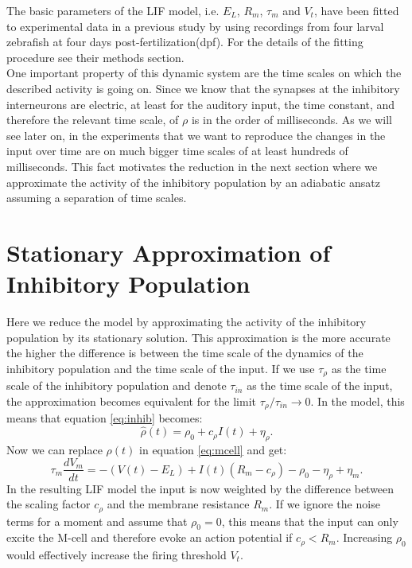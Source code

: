 \documentclass[a4paper,10pt,hidelinks]{scrreprt}
\begin{document}
	The basic parameters of the LIF model, i.e. $E_L$, $R_m$, $\tau_m$ and $V_t$, have been fitted to experimental data in a previous study by \cite{Koyama2016} using recordings from four larval zebrafish at four days post-fertilization(dpf).
	For the details of the fitting procedure see their methods section.\\
	One important property of this dynamic system are the time scales on which the described activity is going on.
	Since we know that the synapses at the inhibitory interneurons are electric, at least for the auditory input, the time constant, and therefore the relevant time scale, of $\rho$ is in the order of milliseconds.
	As we will see later on, in the experiments that we want to reproduce the changes in the input over time are on much bigger time scales of at least hundreds of milliseconds.
	This fact motivates the reduction in the next section where we approximate the activity of the inhibitory population by an adiabatic ansatz assuming a separation of time scales.
	\section{Stationary Approximation of Inhibitory Population}\label{approx inhibition}
	Here we reduce the model by approximating the activity of the inhibitory population by its 
	stationary solution.
	This approximation is the more accurate the higher the difference is between the time scale of the dynamics of the inhibitory population and the time scale of the input.
	If we use $\tau_{\rho}$ as the time scale of the inhibitory population and denote $\tau_{in}$ as the time scale of the input, the approximation becomes equivalent for the limit $\tau_{\rho}/ \tau_{in} \rightarrow 0$.
	In the model, this means that equation \ref{eq:inhib} becomes:
	\begin{equation}
	\hat{\rho} (t) = \rho_{0} + c_{\rho} I(t) + \eta_{\rho}.
	\label{eq:inhib_approx}
	\end{equation}
	Now we can replace $\rho (t)$ in equation \ref{eq:mcell} and get:
	\begin{equation}
	\tau _m \frac{dV_m}{dt} = - (V(t) - E_{L}) + I(t)(R_{m} - c_{\rho}) - \rho_{0} - 
	\eta_{\rho} +  \eta _m.
	\label{eq:mcell_approx1}
	\end{equation}
	In the resulting LIF model the input is now weighted by the difference between the scaling 
	factor $c_{\rho}$ and the membrane resistance $R_m$.
	If we ignore the noise terms for a moment and assume that $\rho_{0}=0$, this means that the 
	input can only excite the M-cell and therefore evoke an action potential if $c_{\rho} < R_m$.
	Increasing $\rho_{0}$ would effectively increase the firing threshold $V_t$.
\end{document}
